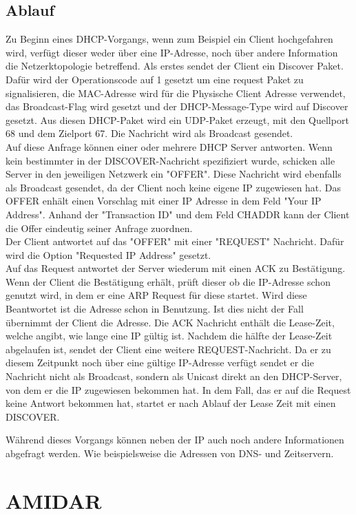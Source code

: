 \subsection{Ablauf}

Zu Beginn eines DHCP-Vorgangs, wenn zum Beispiel ein Client hochgefahren wird, verfügt dieser weder über eine IP-Adresse, noch über andere Information die Netzerktopologie betreffend. Als erstes sendet der Client ein Discover Paket. Dafür wird der Operationscode auf 1 gesetzt um eine request Paket zu signalisieren, die MAC-Adresse wird für die Physische Client Adresse verwendet, das Broadcast-Flag wird gesetzt und der DHCP-Message-Type wird auf Discover gesetzt. Aus diesen DHCP-Paket wird ein UDP-Paket erzeugt, mit den Quellport  68 und dem Zielport 67. Die Nachricht wird als Broadcast gesendet. \\
Auf diese Anfrage können einer oder mehrere DHCP Server antworten. Wenn kein bestimmter in der DISCOVER-Nachricht spezifiziert wurde, schicken alle Server in den jeweiligen Netzwerk ein "{}OFFER". Diese Nachricht wird ebenfalls als Broadcast gesendet, da der Client noch keine eigene IP zugewiesen hat. Das OFFER enhält einen Vorschlag mit einer IP Adresse in dem Feld "Your IP Address". Anhand der "Transaction ID"{} und dem Feld CHADDR kann der Client die Offer eindeutig seiner Anfrage zuordnen. \\
Der Client antwortet auf das "{}OFFER"{} mit einer "REQUEST"{} Nachricht. Dafür wird die Option "Requested IP Address"{} gesetzt. \\
Auf das Request antwortet der Server wiederum mit einen ACK zu Bestätigung. Wenn der Client die Bestätigung erhält, prüft dieser ob die IP-Adresse schon genutzt wird, in dem er eine ARP Request für diese startet. Wird diese Beantwortet ist die Adresse schon in Benutzung. Ist dies nicht der Fall übernimmt der Client die Adresse. 
Die ACK Nachricht enthält die Lease-Zeit, welche angibt, wie lange eine IP gültig ist. 
Nachdem die hälfte der Lease-Zeit abgelaufen ist, sendet der Client eine weitere REQUEST-Nachricht. Da er zu diesem Zeitpunkt noch über eine gültige IP-Adresse verfügt sendet er die Nachricht nicht als Broadcast, sondern als Unicast direkt an den DHCP-Server, von dem er die IP zugewiesen bekommen hat. In dem Fall, das er auf die Request keine Antwort bekommen hat, startet er nach Ablauf der Lease Zeit mit einen DISCOVER.


Während dieses Vorgangs können neben der IP auch noch andere Informationen abgefragt werden. Wie beispielsweise die Adressen von DNS- und Zeitservern.





\section{AMIDAR}